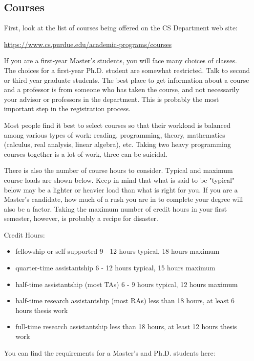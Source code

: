 \subsection{Courses}

First, look at the list of courses being offered on the CS Department web site:

\centerline{\url{https://www.cs.purdue.edu/academic-programs/courses}}
\vspace{\baselineskip}

If you are a first-year Master's students, you will face many choices of classes. The choices for a first-year Ph.D. student are somewhat restricted. Talk to second or third year graduate students. The best place to get information about a course and a professor is from someone who has taken the course, and not necessarily your advisor or professors in the department. This is probably the most important step in the registration process.

Most people find it best to select courses so that their workload is balanced among various types of work: reading, programming, theory, mathematics (calculus, real analysis, linear algebra), etc. Taking two heavy programming courses together is a lot of work, three can be suicidal.

There is also the number of course hours to consider. Typical and maximum course loads are shown below. Keep in mind that what is said to be "typical" below may be a lighter or heavier load than what is right for you. If you are a Master's candidate, how much of a rush you are in to complete your degree will also be a factor. Taking the maximum number of credit hours in your first semester, however, is probably a recipe for disaster.

Credit Hours:
\begin{itemize}
	\item fellowship or self-supported 9 - 12 hours typical, 18 hours maximum
	\item quarter-time assistantship 6 - 12 hours typical, 15 hours maximum
	\item half-time assistantship (most TAs) 6 - 9 hours typical, 12 hours maximum
	\item half-time research assistantship (most RAs) less than 18 hours, at least 6 hours thesis work
	\item full-time research assistantship less than 18 hours, at least 12 hours thesis work
\end{itemize}

You can find the requirements for a Master's and Ph.D. students here:

